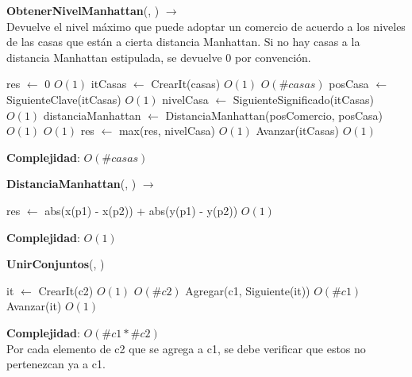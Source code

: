\begin{Algoritmos}
\begin{algorithm}[H]{\textbf{ObtenerNivelManhattan}(, ) $\to$ }
\\ {\small Devuelve el nivel máximo que puede adoptar un comercio de acuerdo a los niveles de las casas que están a cierta distancia Manhattan. Si no hay casas a la distancia Manhattan estipulada, se devuelve 0 por convención.}
\begin{algorithmic}[1]
    \State res $\gets$ 0 \Comment $O(1)$
    \State itCasas $\gets$ CrearIt(casas) \Comment $O(1)$
     \Comment $O(\#casas)$
        \State posCasa $\gets$ SiguienteClave(itCasas) \Comment $O(1)$
        \State nivelCasa $\gets$ SiguienteSignificado(itCasas) \Comment $O(1)$
        \State distanciaManhattan $\gets$ DistanciaManhattan(posComercio, posCasa) \Comment $O(1)$
         \Comment $O(1)$
            \State res $\gets$ max(res, nivelCasa) \Comment $O(1)$
        \EndIf
        \State Avanzar(itCasas) \Comment $O(1)$
    \EndWhile
\end{algorithmic}
\textbf{Complejidad}: $O(\#casas)$
\end{algorithm}

\begin{algorithm}[H]{\textbf{DistanciaManhattan}(, ) $\to$ }
\begin{algorithmic}[1]
    \State res $\gets$ abs(x(p1) - x(p2)) + abs(y(p1) - y(p2)) \Comment $O(1)$
\end{algorithmic}
\textbf{Complejidad}: $O(1)$
\end{algorithm}

\begin{algorithm}[H]{\textbf{UnirConjuntos}(, )}
\begin{algorithmic}[1]
    \State it $\gets$ CrearIt(c2) \Comment $O(1)$
     \Comment $O(\#c2)$
        \State Agregar(c1, Siguiente(it)) \Comment $O(\#c1)$
        \State Avanzar(it) \Comment $O(1)$
    \EndWhile
\end{algorithmic}
\textbf{Complejidad}: $O(\#c1 * \#c2)$ \\
Por cada elemento de c2 que se agrega a c1, se debe verificar que estos no pertenezcan ya a c1.
\end{algorithm}

\end{Algoritmos}
